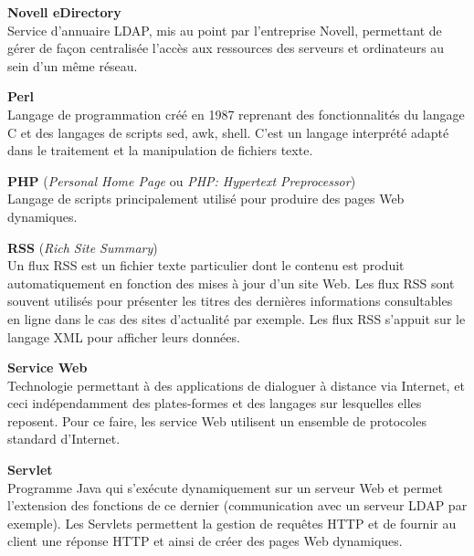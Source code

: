 \vspace{0.5cm}

\textbf{Novell eDirectory}\\
Service d'annuaire LDAP, mis au point par l'entreprise Novell, permettant de g\'erer de fa\c{c}on centralis\'ee l'acc\`es aux ressources des serveurs et ordinateurs au sein d'un m\^eme r\'eseau.

\vspace{0.5cm}

\textbf{Perl}\\
Langage de programmation cr\'e\'e en 1987 reprenant des fonctionnalit\'es du langage C et des langages de scripts sed, awk, shell.
C'est un langage interpr\'et\'e adapt\'e dans le traitement et la manipulation de fichiers texte.

\vspace{0.5cm}

\textbf{PHP} (\textit{Personal Home Page} ou \textit{PHP: Hypertext Preprocessor})\\
Langage de scripts principalement utilis\'e pour produire des pages Web dynamiques.

\vspace{0.5cm}

\textbf{RSS} (\textit{Rich Site Summary})\\
Un flux RSS est un fichier texte particulier dont le contenu est produit automatiquement en fonction des mises \`a jour d'un site Web.
Les flux RSS sont souvent utilis\'es pour pr\'esenter les titres des derni\`eres informations consultables en ligne dans le cas des sites d'actualit\'e par exemple.
Les flux RSS s'appuit sur le langage XML pour afficher leurs donn\'ees.

\vspace{0.5cm}

\textbf{Service Web}\\
Technologie permettant \`a des applications de dialoguer \`a distance via Internet, et ceci ind\'ependamment des plates-formes et des langages sur lesquelles elles reposent.
Pour ce faire, les service Web utilisent un ensemble de protocoles standard d'Internet.

\vspace{0.5cm}

\textbf{Servlet}\\
Programme Java qui s'ex\'ecute dynamiquement sur un serveur Web et permet l'extension des fonctions de ce dernier (communication avec un serveur LDAP par exemple).
Les Servlets permettent la gestion de requ\^etes HTTP et de fournir au client une r\'eponse HTTP et ainsi de cr\'eer des pages Web dynamiques.


